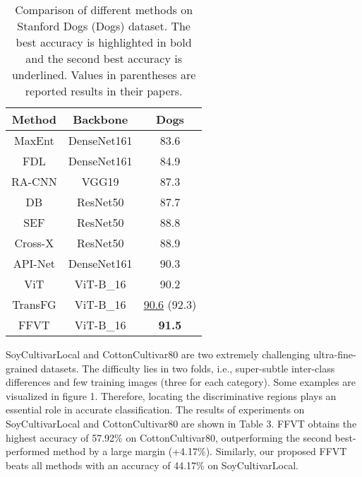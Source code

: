 \documentclass{bmvc2k}
\begin{document}
\begin{table}[!h]
\caption{Comparison of different methods on Stanford Dogs (Dogs) dataset. The best accuracy is highlighted in bold and the second best accuracy is underlined. Values in parentheses are reported results in their papers.}
\centering
\begin{tabular}{c|c|c}
\toprule  
Method& Backbone& Dogs\\
\hline
MaxEnt \cite{dubey2018maximum}& DenseNet161 & 83.6\\
FDL \cite{liu2020filtration}&  DenseNet161 & 84.9\\
RA-CNN \cite{fu2017look}&  VGG19 & 87.3\\
DB \cite{sun2020fine}&  ResNet50 & 87.7\\
SEF \cite{luo2020learning}&  ResNet50 & 88.8\\
Cross-X \cite{luo2019cross}&  ResNet50 & 88.9\\
API-Net \cite{zhuang2020learning}&  DenseNet161 & 90.3\\
\hline
ViT \cite{dosovitskiy2020image}&  ViT-B\_16&  90.2\\

TransFG \cite{he2021transfg}&  ViT-B\_16 &  \underline{90.6} (92.3)\\
FFVT&  ViT-B\_16 &  \textbf{91.5}\\
\bottomrule 
\end{tabular}
\end{table}

SoyCultivarLocal and CottonCultivar80 are two extremely challenging ultra-fine-grained datasets. The difficulty lies in two folds, i.e., super-subtle inter-class differences and few training images (three for each category). Some examples are visualized in figure 1. Therefore, locating the discriminative regions plays an essential role in accurate classification. The results of experiments on SoyCultivarLocal and CottonCultivar80 are shown in Table 3. FFVT obtains the highest accuracy of 57.92\% on CottonCultivar80, outperforming the second best-performed method by a large margin (+4.17\%). Similarly, our proposed FFVT beats all methods with an accuracy of 44.17\% on SoyCultivarLocal.
\par
\end{document}
